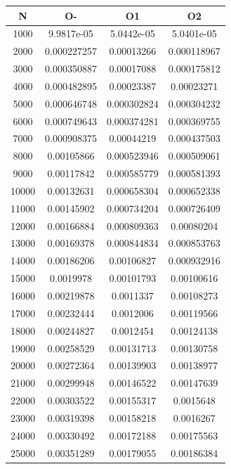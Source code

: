\begin{center}
\begin{tabular}{| c | c | c | c |}
\hline
\textbf{N} & \textbf{O-} & \textbf{O1} & \textbf{O2} \\ \hline
1000 & 9.9817e-05 & 5.0442e-05 & 5.0401e-05 \\ \hline
2000 & 0.000227257 & 0.00013266 & 0.000118967 \\ \hline
3000 & 0.000350887 & 0.00017088 & 0.000175812 \\ \hline
4000 & 0.000482895 & 0.00023387 & 0.00023271 \\ \hline
5000 & 0.000646748 & 0.000302824 & 0.000304232 \\ \hline
6000 & 0.000749643 & 0.000374281 & 0.000369755 \\ \hline
7000 & 0.000908375 & 0.00044219 & 0.000437503 \\ \hline
8000 & 0.00105866 & 0.000523946 & 0.000509061 \\ \hline
9000 & 0.00117842 & 0.000585779 & 0.000581393 \\ \hline
10000 & 0.00132631 & 0.000658304 & 0.000652338 \\ \hline
11000 & 0.00145902 & 0.000734204 & 0.000726409 \\ \hline
12000 & 0.00166884 & 0.000809363 & 0.00080204 \\ \hline
13000 & 0.00169378 & 0.000844834 & 0.000853763 \\ \hline
14000 & 0.00186206 & 0.00106827 & 0.000932916 \\ \hline
15000 & 0.0019978 & 0.00101793 & 0.00100616 \\ \hline
16000 & 0.00219878 & 0.0011337 & 0.00108273 \\ \hline
17000 & 0.00232444 & 0.0012006 & 0.00119566 \\ \hline
18000 & 0.00244827 & 0.0012454 & 0.00124138 \\ \hline
19000 & 0.00258529 & 0.00131713 & 0.00130758 \\ \hline
20000 & 0.00272364 & 0.00139903 & 0.00138977 \\ \hline
21000 & 0.00299948 & 0.00146522 & 0.00147639 \\ \hline
22000 & 0.00303522 & 0.00155317 & 0.0015648 \\ \hline
23000 & 0.00319398 & 0.00158218 & 0.0016267 \\ \hline
24000 & 0.00330492 & 0.00172188 & 0.00175563 \\ \hline
25000 & 0.00351289 & 0.00179055 & 0.00186384 \\ \hline

\end{tabular}
\end{center}
